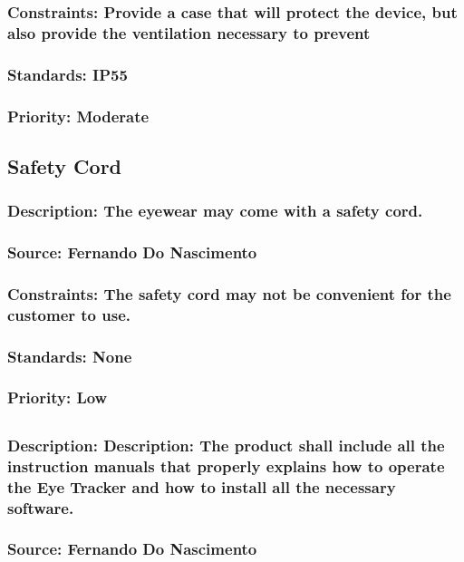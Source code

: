 \subsubsection{Constraints: Provide a case that will protect the device, but also provide the ventilation necessary to prevent}
\subsubsection{Standards: IP55}
\subsubsection{Priority: Moderate}

\subsection{\bfEyewear Safety Cord}
\subsubsection{Description: The eyewear may come with a safety cord.}
\subsubsection{Source: Fernando Do Nascimento}
\subsubsection{Constraints: The safety cord may not be convenient for the customer to use.}
\subsubsection{Standards: None}
\subsubsection{Priority: Low}

\subsection{\bfManuals}
\subsubsection{Description: Description: The product shall include all the instruction manuals that properly explains how to operate the Eye Tracker and how to install all the necessary software.}
\subsubsection{Source: Fernando Do Nascimento}
